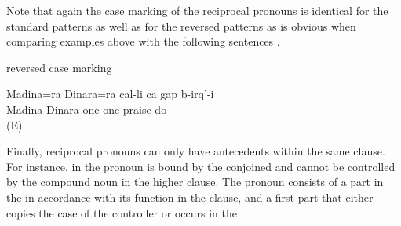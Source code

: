 Note that again the case marking of the reciprocal pronouns is identical for the standard patterns as well as for the reversed patterns as is obvious when comparing examples above with the following sentences .

\begin{exe}
	\ex	reversed case marking	\label{ex:Madina and Dinara (regularly) praised each other2}
	\begin{xlist}
		\ex	\label{ex:Madina and Dinara (regularly) praised each other@A2}
		\gll	Madina=ra	Dinara=ra	cal-li	ca	gap	b-irq'-i\\
			Madina\tsc{=add}	Dinara	one	one	praise	do\\
		\glt	{} (E)

		\ex	{}	\label{ex:Madina and Dinara (regularly) praised each other@B2}

		\ex	{}	\label{ex:Madina and Dinara (regularly) praised each other@C2}
	\end{xlist}
\end{exe}

Finally, reciprocal pronouns can only have antecedents within the same clause. For instance, in  the pronoun is bound by the conjoined   and cannot be controlled by the compound noun   in the higher clause. The pronoun consists of a part in the  in accordance with its function in the clause, and a first part that either copies the case of the controller  or occurs in the  .

